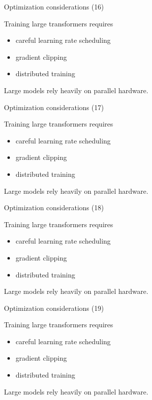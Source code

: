 \documentclass[aspectratio=169]{beamer}
\begin{document}
\begin{frame}{Optimization considerations (16)}

Training large transformers requires

\begin{itemize}
\item careful learning rate scheduling
\item gradient clipping
\item distributed training
\end{itemize}

Large models rely heavily on parallel hardware.

\end{frame}


\begin{frame}{Optimization considerations (17)}

Training large transformers requires

\begin{itemize}
\item careful learning rate scheduling
\item gradient clipping
\item distributed training
\end{itemize}

Large models rely heavily on parallel hardware.

\end{frame}


\begin{frame}{Optimization considerations (18)}

Training large transformers requires

\begin{itemize}
\item careful learning rate scheduling
\item gradient clipping
\item distributed training
\end{itemize}

Large models rely heavily on parallel hardware.

\end{frame}


\begin{frame}{Optimization considerations (19)}

Training large transformers requires

\begin{itemize}
\item careful learning rate scheduling
\item gradient clipping
\item distributed training
\end{itemize}

Large models rely heavily on parallel hardware.

\end{frame}
\end{document}
